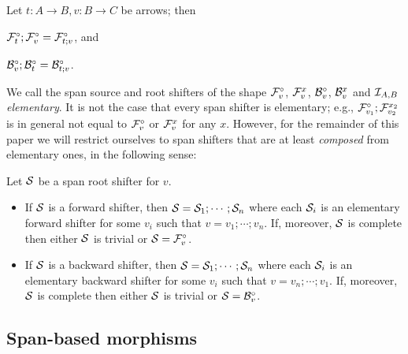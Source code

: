 \begin{lemma}
Let $t:A\to B,v:B\to C$ be arrows; then
\begin{enumerate*}[topsep=\smallskipamount]
\item $\dF t;\dF v=\dF{t;v}$, and 
\item $\dB v;\dB t=\dB{t;v}$.
\end{enumerate*}
\end{lemma}
%
We call the span source and root shifters of the shape $\dF v$, $\rF v x$, $\dB v$, $\rB v x$ and $\cI_{A,B}$ \emph{elementary}. It is not the case that every span shifter is elementary; e.g., $\dF{v_1};\rF{v_2}{x_2}$ is in general not equal to $\dF v$ or $\rF v x$ for any $x$. However, for the remainder of this paper we will restrict ourselves to span shifters that are at least \emph{composed} from elementary ones, in the following sense:

\begin{assumption} Let $\cS$ be a span root shifter for $v$.
\begin{itemize}[topsep=\smallskipamount]
\item If $\cS$ is a forward shifter, then $\cS = \cS_1;\cdots;\cS_n$ where each $\cS_i$ is an elementary forward shifter for some $v_i$ such that $v=v_1;\cdots;v_n$. If, moreover, $\cS$ is complete then either $\cS$ is trivial or $\cS=\dF v$.
\item If $\cS$ is a backward shifter, then $\cS = \cS_1;\cdots;\cS_n$ where each $\cS_i$ is an elementary backward shifter for some $v_i$ such that $v=v_n;\cdots;v_1$. If, moreover, $\cS$ is complete then either $\cS$ is trivial or $\cS=\dB{v}$.
\end{itemize}
\end{assumption}
 
\subsection{Span-based morphisms}

